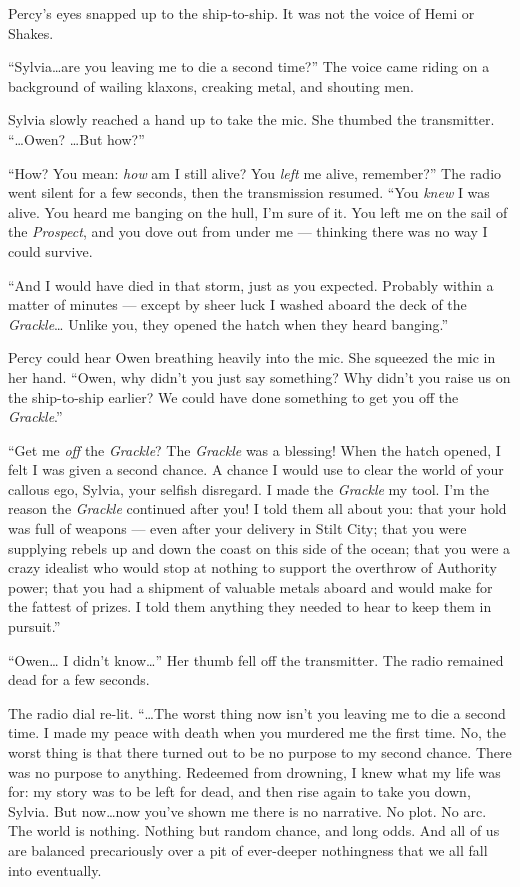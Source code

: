 \documentclass[
]{scrbook}
\begin{document}
Percy's eyes snapped up to the ship-to-ship. It was not the voice of
Hemi or Shakes.

``Sylvia\ldots are you leaving me to die a second time?'' The voice came
riding on a background of wailing klaxons, creaking metal, and shouting
men.

Sylvia slowly reached a hand up to take the mic. She thumbed the
transmitter. ``\ldots Owen? \ldots But how?''

``How? You mean: \emph{how} am I still alive? You \emph{left} me alive,
remember?'' The radio went silent for a few seconds, then the
transmission resumed. ``You \emph{knew} I was alive. You heard me
banging on the hull, I'm sure of it. You left me on the sail of the
\emph{Prospect}, and you dove out from under me --- thinking there was
no way I could survive.

``And I would have died in that storm, just as you expected. Probably
within a matter of minutes --- except by sheer luck I washed aboard the
deck of the \emph{Grackle}\ldots{} Unlike you, they opened the hatch
when they heard banging.''

Percy could hear Owen breathing heavily into the mic. She squeezed the
mic in her hand. ``Owen, why didn't you just say something? Why didn't
you raise us on the ship-to-ship earlier? We could have done something
to get you off the \emph{Grackle}.''

``Get me \emph{off} the \emph{Grackle}? The \emph{Grackle} was a
blessing! When the hatch opened, I felt I was given a second chance. A
chance I would use to clear the world of your callous ego, Sylvia, your
selfish disregard. I made the \emph{Grackle} my tool. I'm the reason the
\emph{Grackle} continued after you! I told them all about you: that your
hold was full of weapons --- even after your delivery in Stilt City;
that you were supplying rebels up and down the coast on this side of the
ocean; that you were a crazy idealist who would stop at nothing to
support the overthrow of Authority power; that you had a shipment of
valuable metals aboard and would make for the fattest of prizes. I told
them anything they needed to hear to keep them in pursuit.''

``Owen\ldots{} I didn't know\ldots{}'' Her thumb fell off the
transmitter. The radio remained dead for a few seconds.

The radio dial re-lit. ``\ldots The worst thing now isn't you leaving me
to die a second time. I made my peace with death when you murdered me
the first time. No, the worst thing is that there turned out to be no
purpose to my second chance. There was no purpose to anything. Redeemed
from drowning, I knew what my life was for: my story was to be left for
dead, and then rise again to take you down, Sylvia. But now\ldots now
you've shown me there is no narrative. No plot. No arc. The world is
nothing. Nothing but random chance, and long odds. And all of us are
balanced precariously over a pit of ever-deeper nothingness that we all
fall into eventually.
\end{document}
